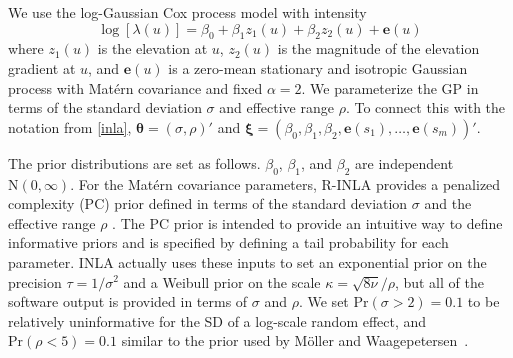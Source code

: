 \documentclass[]{interact}
\begin{document}
We use the log-Gaussian Cox process model with intensity
\begin{displaymath}
\log\left[\lambda(u)\right] = \beta_{0} + \beta_{1} z_{1}(u)
+ \beta_{2} z_{2}(u) + \mathbf{e}(u)
\end{displaymath}
where \(z_{1}(u)\) is the elevation at \(u\), \(z_{2}(u)\) is the magnitude of
the elevation gradient at \(u\), and \(\mathbf{e}(u)\) is a zero-mean
stationary and isotropic Gaussian process with Mat\'{e}rn covariance and fixed
\(\alpha = 2\). We parameterize the GP in terms of the standard deviation
\(\sigma\) and effective range \(\rho\). To connect this with the notation
from \ref{inla}, \(\boldsymbol{\theta} = (\sigma, \rho)'\) and
\(\boldsymbol{\xi} = (\beta_{0}, \beta_{1}, \beta_{2}, \mathbf{e}(s_{1}),
\dots, \mathbf{e}(s_{m}))'\).

The prior distributions are set as follows. \(\beta_{0}\), \(\beta_{1}\), and
\(\beta_{2}\) are independent \(\mathrm{N}(0, \infty)\). For the Mat\'{e}rn
covariance parameters, R-INLA provides a penalized complexity (PC) prior
defined in terms of the standard deviation \(\sigma\) and the effective range
\(\rho\) \cite{fuglstadetal,simpsonpc}. The PC prior is intended to provide an
intuitive way to define informative priors and is specified by defining a tail
probability for each parameter. INLA actually uses these inputs to set an
exponential prior on the precision \(\tau = 1 / \sigma^{2}\) and a Weibull
prior on the scale \(\kappa = \sqrt{8 \nu} / \rho\), but all of the software output
is provided in terms of \(\sigma\) and \(\rho\). We set
\(\mathrm{Pr}(\sigma > 2) = 0.1\) to be relatively uninformative for the SD of
a log-scale random effect, and \(\mathrm{Pr}(\rho < 5) = 0.1\) similar to the
prior used by M\"{o}ller and Waagepetersen~\cite{moellerwaagepetersen}.
\end{document}
